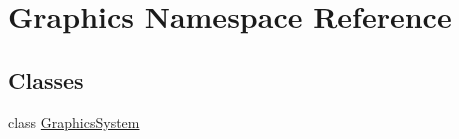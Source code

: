 \hypertarget{namespace_graphics}{}\section{Graphics Namespace Reference}
\label{namespace_graphics}
\subsection*{Classes}
\begin{DoxyCompactItemize}
\item 
class \hyperlink{class_graphics_1_1_graphics_system}{Graphics\+System}
\end{DoxyCompactItemize}
